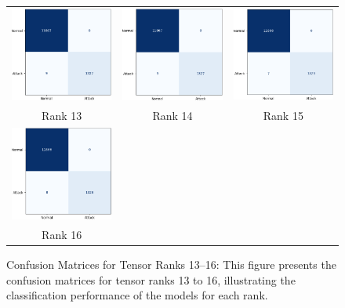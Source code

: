 \documentclass[preprint,12pt,authoryear]{elsarticle}
\begin{document}
\begin{figure}[H]
    \centering
    \begin{tabular}{ccc}
        \includegraphics[width=0.3\linewidth]{rank_13.png} &
        \includegraphics[width=0.3\linewidth]{rank_14.png} &
        \includegraphics[width=0.3\linewidth]{rank_15.png} \\
        \small Rank 13 & \small Rank 14 & \small Rank 15 \\[6pt]

        \includegraphics[width=0.3\linewidth]{rank_16.png} & & \\
        \small Rank 16 & & 
    \end{tabular}
    \caption{Confusion Matrices for Tensor Ranks 13–16: This figure presents the confusion matrices for tensor ranks 13 to 16, illustrating the classification performance of the models for each rank.}
    \label{fig:confusion_matrices_3}
\end{figure}
\end{document}
